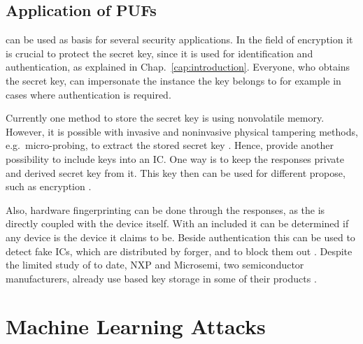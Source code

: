 \subsection{Application of PUFs}
\label{sec:applicationsofpufs}

\pufs can be used as basis for several security applications.
In the field of encryption it is crucial to protect the secret key, since it is used for identification and authentication, as explained in Chap.\ \ref{cap:introduction}.
Everyone, who obtains the secret key, can impersonate the instance the key belongs to for example in cases where  authentication is required.

Currently one method to store the secret key is using nonvolatile memory.
However, it is possible with invasive and noninvasive physical tampering methods, e.g.\ micro-probing, to extract the stored secret key \cite{Lim2005ExtractingCircuits}. %
Hence, \pufs provide another possibility to include keys into an \ac{IC}.
One way is to keep the \puf responses private and derived secret key from it.
This key then can be used for different propose, such as encryption \cite{Tajik2014PhysicalPUFs}.

Also, hardware fingerprinting can be done through the \puf responses, as the \puf is directly coupled with the device itself.
With an included \puf it can be determined if any device is the device it claims to be. %
Beside authentication this can be used to detect fake \acp{IC}, which are distributed by forger, and to block them out \cite{Machida2015ImplementationFPGA}.
Despite the limited study of \pufs to date, \ac{NXP} and Microsemi, two semiconductor manufacturers, already use \puf based key storage in some of their products \cite{Becker2015ThePUFs}.



\section{Machine Learning Attacks}

